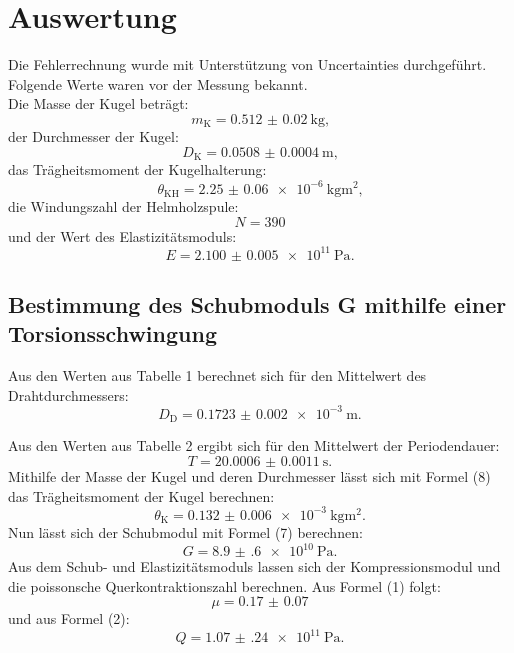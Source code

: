 
\section{Auswertung}
\label{sec:Auswertung}
Die Fehlerrechnung wurde mit Unterstützung von Uncertainties \cite{uncertainties} durchgeführt.
Folgende Werte waren vor der Messung bekannt.\\
Die Masse der Kugel beträgt:
\begin{displaymath}
	m_\text{K} = \SI{0.512(20)}{\kilogram}\text{,}
\end{displaymath}
der Durchmesser der Kugel:
\begin{displaymath}
	D_\text{K} = \SI{0.0508(4)}{\meter}\text{,}
\end{displaymath}
das Trägheitsmoment der Kugelhalterung:  
\begin{displaymath}
	\theta_\text{KH} = \SI{2.25(6)e-6}{\kilogram\meter\squared}\text{,}
\end{displaymath}
die Windungszahl der Helmholzspule:
\begin{displaymath}
	N = \num{390}
\end{displaymath}
und der Wert des Elastizitätsmoduls:  
\begin{displaymath}
	E = \SI{2.100(5)e11}{\pascal}\text{.}
\end{displaymath}




\subsection{Bestimmung des Schubmoduls G mithilfe einer Torsionsschwingung}

Aus den Werten aus Tabelle 1 berechnet sich für den Mittelwert des Drahtdurchmessers:
\begin{displaymath}
	D_\text{D} = \SI{0.1723(20)e-3}{\meter}\text{.}
\end{displaymath}

Aus den Werten aus Tabelle 2 ergibt sich für den Mittelwert der Periodendauer:
\begin{displaymath}
	T = \SI{20.0006(11)}{\second}\text{.}
\end{displaymath}
Mithilfe der Masse der Kugel und deren Durchmesser lässt sich mit Formel (8) das Trägheitsmoment der Kugel berechnen:
\begin{displaymath}
	\theta_{\text{K}} = \SI{0.132(6)e-3}{\kilogram\meter\squared}\text{.}
\end{displaymath}
Nun lässt sich der Schubmodul mit Formel (7) berechnen:
\begin{displaymath}
	G = \SI{8.9(6)e10}{\pascal}\text{.}
\end{displaymath}
Aus dem Schub- und Elastizitätsmoduls lassen sich der Kompressionsmodul und die poissonsche Querkontraktionszahl berechnen. Aus Formel (1) folgt:
\begin{displaymath}
	\mu = \num{0.17(7)}
\end{displaymath}
und aus Formel (2):
\begin{displaymath}
	Q = \SI{1.07(24)e11}{\pascal}\text{.}
\end{displaymath}

